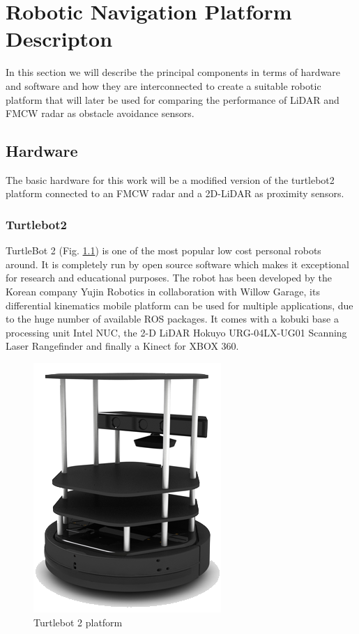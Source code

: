 \chapter{Robotic Navigation Platform Descripton}

In this section we will describe the principal components in terms of hardware and software and how they are interconnected to create a suitable robotic platform that will later be used for comparing the performance of \ac{LiDAR} and \ac{FMCW} \ac{radar} as obstacle avoidance sensors.


\section{Hardware}
The basic hardware for this work will be a  modified version of the  turtlebot2 platform connected to an \ac{FMCW} \ac{radar} and a 2D-\ac{LiDAR} as proximity sensors.


\subsection{Turtlebot2}
TurtleBot 2 (Fig. \ref{fig:t2}) is one of the  most popular low cost personal robots around. It is completely run by open source software which makes it exceptional for research and educational purposes. The robot has been developed by the Korean company Yujin Robotics in collaboration with Willow Garage, its differential kinematics mobile platform can be used for multiple applications, due to the huge number of available ROS packages. It comes with a kobuki base a processing unit Intel NUC, the 2-D \ac{LiDAR} Hokuyo URG-04LX-UG01 Scanning Laser Rangefinder and finally a Kinect for XBOX 360.

\begin{figure}[h] 
\centerline{\includegraphics [width=0.3 \textwidth]{imgs/chapter4/turtlebot2.png}}
\caption{Turtlebot 2 platform}
\label{fig:t2}
\end{figure}

